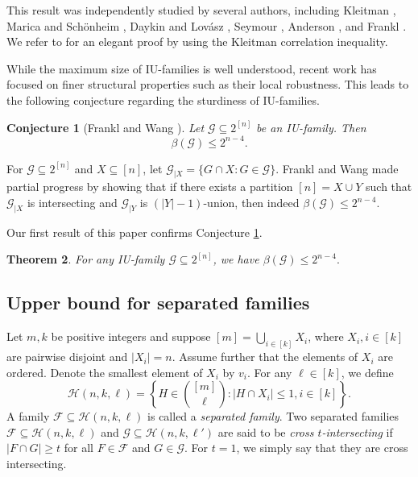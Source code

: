 \documentclass[11pt]{article}
\newtheorem{theorem}{Theorem}[section]
\newtheorem{conjecture}[theorem]{Conjecture}
\begin{document}
 This result was independently studied by several authors, including Kleitman \cite{Kle1966}, 
 Marica and Sch\"{o}nheim \cite{MS1969}, 
 Daykin and Lov\'{a}sz \cite{DL1975}, 
 Seymour \cite{Sey1973}, 
 Anderson \cite{And1976}, 
 and Frankl \cite{Fra1975}. 
 We refer to \cite[Theorem 6.3]{FT2016} for an elegant proof by using the Kleitman correlation inequality. 

 While the maximum size of IU-families is well understood, recent work has focused on finer structural properties such as their local robustness. This leads to the following conjecture \cite{FW-stur} regarding the sturdiness of IU-families.
 
\begin{conjecture}[Frankl and Wang \cite{FW-stur}] \label{cj1} 
Let $\mathcal{G}\subseteq 2^{[n]}$ be an IU-family. Then
$$
\beta(\mathcal{G})\leq 2^{n-4}.
$$
\end{conjecture}


For $\mathcal{G}\subseteq 2^{[n]}$ and $X\subseteq [n]$, let $\mathcal{G}_{| X}=\{G\cap X: G\in \mathcal{G}\}$.
Frankl and Wang \cite{FW-stur} made partial progress by showing that if there exists a partition $[n]=X\cup Y$ such that $\mathcal{G}_{| X}$ is intersecting and $\mathcal{G}_{| Y}$ is $(|Y|-1)$-union, then indeed $\beta(\mathcal{G})\leq 2^{n-4}$. 


Our first result of this paper confirms Conjecture \ref{cj1}.

\begin{theorem}\label{t1}
For any IU-family $\mathcal{G}\subseteq 2^{[n]}$, we have 
$
\beta(\mathcal{G})\leq2^{n-4}.
$
\end{theorem}








\subsection{Upper bound for separated families}

 Let $m,k$ be positive integers and suppose $[m]=\bigcup_{i\in[k]}X_i$,  where $X_i, i\in [k]$ are pairwise disjoint and $|X_i|=n$. 
Assume further that the elements of $X_i$ are ordered.
Denote the smallest element of $X_i$ by $v_i$.
For any $\ell\in [k]$, we define 
$$\mathcal{H}(n,k,\ell)=\left\{H\in\binom {[m]}{\ell}:|H\cap X_i|\le 1,i\in [k]\right\}.$$ 
A family $\mathcal{F}\subseteq \mathcal{H}(n,k,\ell)$ is called  a \textit{separated family}. Two separated families  $\mathcal{F}\subseteq\mathcal{H}(n,k,\ell)$ and $\mathcal{G}\subseteq\mathcal{H}(n,k,\ell')$ are said to be \textit{cross $t$-intersecting} if $|F\cap G|\geq  t$
 for all $F\in \mathcal{F}$ and $G\in \mathcal{G}$. For $t=1$, we simply
say that they are cross intersecting.
\end{document}
